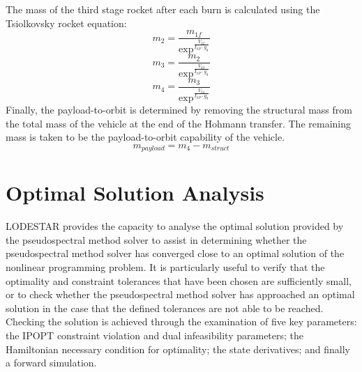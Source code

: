 The mass of the third stage rocket after each burn is calculated using the Tsiolkovsky rocket equation:
\begin{equation}
m_2 = \frac{m_{1f}}{\exp^{\frac{V_{12}}{I_{SP} \cdot g_0}}}
\end{equation}
\begin{equation}
m_3 = \frac{m_{2}}{\exp^{\frac{V_{23}}{I_{SP} \cdot g_0}}}
\end{equation}
\begin{equation}
m_4 = \frac{m_{3}}{\exp^{\frac{V_{34}}{I_{SP} \cdot g_0}}}
\end{equation}
Finally, the payload-to-orbit is determined by removing the structural mass from the total mass of the vehicle at the end of the Hohmann transfer. The remaining mass is taken to be the payload-to-orbit capability of the vehicle.
\begin{equation}
m_{payload} = m_4 - m_{struct}
\end{equation}







\section{Optimal Solution Analysis}\label{sec:verification}

LODESTAR provides the capacity to analyse the optimal solution provided by the pseudospectral method solver to assist in determining whether the pseudospectral method solver has converged close to an optimal solution of the nonlinear programming problem. It is particularly useful to verify that the optimality and constraint tolerances that have been chosen are sufficiently small, or to check whether the pseudospectral method solver has approached an optimal solution in the case that the defined tolerances are not able to be reached.   
Checking the solution is achieved through the examination of five key parameters: the IPOPT constraint violation and dual infeasibility parameters; the Hamiltonian necessary condition for optimality; the state derivatives; and finally a forward simulation. 

